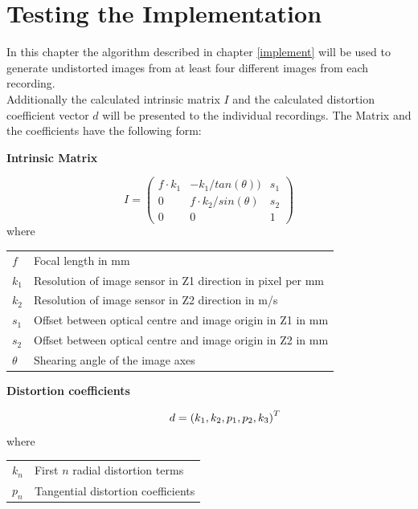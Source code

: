 \section{Testing the Implementation}

In this chapter the algorithm described in chapter \ref{implement} will be used to generate undistorted images from at least four different images from each recording.\\

Additionally the calculated intrinsic matrix $I$ and the calculated distortion coefficient vector $d$ will be presented to the individual recordings. The Matrix  and the coefficients have the following form:\\
\vspace{-6mm}
\begin{center}
\hspace{10mm}\textbf{Intrinsic Matrix}
\end{center}
\begin{equation*}
I =
    \begin{pmatrix}
     f \cdot k_1 & -k_1/tan(\theta)) & s_1\\ 
     0 & f \cdot k_2/sin(\theta) & s_2\\ 
     0 & 0 & 1
    \end{pmatrix}
\end{equation*}
where
\begin{tabular}[t]{ll}
    $f$ & Focal length in mm\\
    $k_1$ & Resolution of image sensor in Z1 direction in pixel per mm\\
    $k_2$ & Resolution of image sensor in Z2 direction  in m/s\\
    $s_1$ & Offset between optical centre and image origin in Z1 in mm\\
    $s_2$ & Offset between optical centre and image origin in Z2 in mm\\
    $\theta$ & Shearing angle of the image axes\\
\end{tabular}
\vspace{5mm}

\begin{center}
\hspace{10mm}\textbf{Distortion coefficients}
\end{center}
\vspace{-2mm}
\begin{equation*}
\hspace{10mm}d =
    \left ( k_1, k_2, p_1, p_2, k_3 \right )^{T}
\end{equation*}
where
\begin{tabular}[t]{ll}
    $k_n$ & First $n$ radial distortion terms\\
    $p_n$ & Tangential distortion coefficients \cite{mat_calib}\\
\end{tabular}

